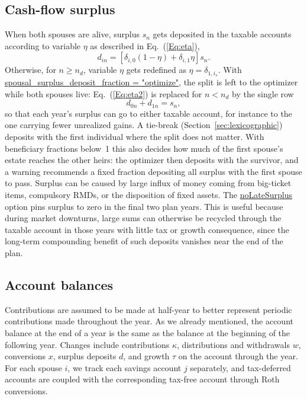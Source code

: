 \documentclass[fleqn,12pt]{report}
\newcommand{\code}[1]{\url{#1}}
\begin{document}
\subsection{Cash-flow surplus}
	When both spouses are alive, surplus $s_n$ gets deposited in the taxable accounts
	according to variable $\eta$ as described in Eq.~(\ref{Eq:eta}),
	\begin{equation}
		\label{Eq:eta2}
		d_{in} = [\delta_{i, 0} (1 - \eta) + \delta_{i, 1}\eta] s_n .
	\end{equation}
	Otherwise, for $n \ge n_d$, variable $\eta$ gets redefined as $\eta = \delta_{1, i_s}$.
	With \code{spousal_surplus_deposit_fraction = "optimize"}, the split is left to the
	optimizer while both spouses live: Eq.~(\ref{Eq:eta2}) is replaced for $n < n_d$ by the
	single row
	\begin{equation}
		d_{0n} + d_{1n} = s_n,
	\end{equation}
	so that each year's surplus can go to either taxable account, for instance to the one
	carrying fewer unrealized gains.  A tie-break (Section~\ref{sec:lexicographic}) deposits
	with the first individual where the split does not matter.  With beneficiary fractions
	below~1 this also decides how much of the first spouse's estate reaches the other heirs:
	the optimizer then deposits with the survivor, and a warning recommends a fixed fraction
	depositing all surplus with the first spouse to pass.
	Surplus can be caused by large influx of money coming from big-ticket items, compulsory RMDs,
	or the disposition of fixed assets.
	The \code{noLateSurplus} option pins surplus to zero in the final two plan years.
	This is useful because during market downturns, large sums can otherwise be recycled
	through the taxable account in those years with little tax or growth consequence,
	since the long-term compounding benefit of such deposits vanishes near the end of the plan.

\subsection{Account balances}
	Contributions are assumed to be made at half-year to better represent periodic contributions
	made throughout the year. As we already mentioned,
	the account balance at the end of a year is the same as the balance
	at the beginning of the following year.
	Changes include contributions $\kappa$, distributions and withdrawals $w$,
	conversions $x$, surplus deposits $d$, and growth $\tau$ on the account through the year.
	For each spouse $i$, we track each savings account $j$ separately, and tax-deferred accounts
	are coupled with the corresponding tax-free account through Roth conversions.
\end{document}
